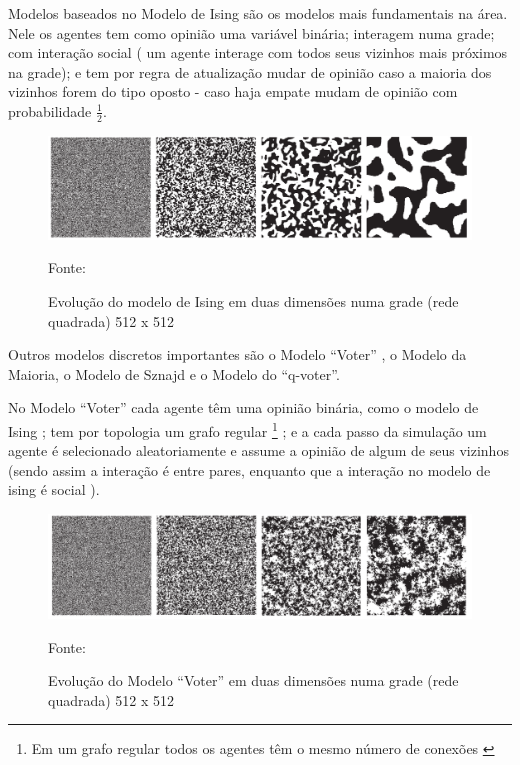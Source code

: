 \quad \quad Modelos baseados no Modelo de Ising são os modelos mais fundamentais na área.
Nele os agentes tem como opinião uma variável binária; interagem numa grade; com
interação social ( um agente interage com todos seus vizinhos mais próximos na
grade); e tem por regra de atualização mudar de opinião caso a maioria dos
vizinhos forem do tipo oposto - caso haja empate mudam de opinião com
probabilidade $\frac{1}{2}$. 
\begin{figure}[H]
  \centering \includegraphics[scale = 0.5]{ims/ising.png}
  \caption{Evolução do modelo de Ising em duas dimensões numa grade (rede quadrada)
    512 x 512}
  Fonte: 
\end{figure}


Outros modelos discretos importantes são o Modelo ``Voter'' , o Modelo da
Maioria, o Modelo de Sznajd e o Modelo do ``q-voter''.

No Modelo ``Voter'' cada agente têm uma opinião binária, como o modelo
de Ising ; tem por topologia um grafo regular \footnote{Em um grafo
  regular todos os agentes têm o mesmo número de conexões \cite{sayama2015introduction}} ; e a cada
passo da simulação um agente é selecionado aleatoriamente e assume a
opinião de algum de seus vizinhos (sendo assim a interação é entre
pares, enquanto que a interação no modelo de ising é social ).

\begin{figure}[H]
  \centering \includegraphics[scale = 0.5]{ims/voter.png}
  \caption{Evolução do Modelo ``Voter'' em duas dimensões numa grade (rede quadrada)
    512 x 512}
  Fonte: 
\end{figure}



